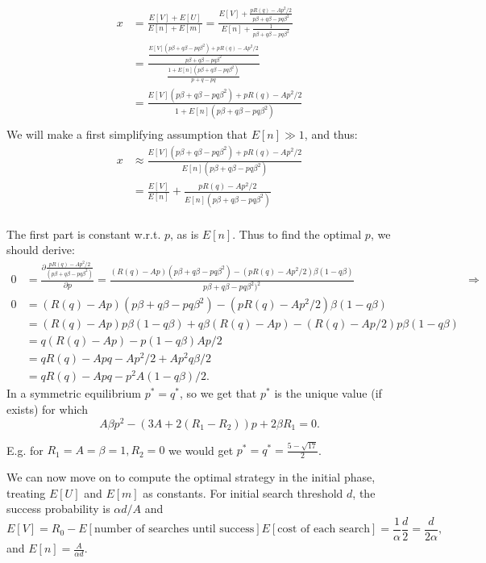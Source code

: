 {%
    \begin{align*}
        x&= \frac{E[V]+E[U]}{E[n]+E[m]} = \frac{E[V]+\frac{p R(q)-Ap^2/2}{p\beta+q\beta-pq\beta^2}}{E[n]+\frac{1}{p\beta+q\beta-pq\beta^2}}\\
        &=\frac{\frac{E[V](p\beta+q\beta-pq\beta^2)+p R(q)-Ap^2/2}{p\beta+q\beta-pq\beta^2}}{\frac{1+E[n](p\beta+q\beta-pq\beta^2)}{p+q-pq}}\\
&=\frac{E[V](p\beta+q\beta-pq\beta^2)+p R(q)-Ap^2/2}{1+E[n](p\beta+q\beta-pq\beta^2)}\\
    \end{align*}
    We will make a first simplifying assumption that $E[n]\gg 1$, and thus:
    \begin{align*}
        x&\approx \frac{E[V](p\beta+q\beta-pq\beta^2)+p R(q)-Ap^2/2}{E[n](p\beta+q\beta-pq\beta^2)}\\
        &=\frac{E[V]}{E[n]} + \frac{p R(q)-Ap^2/2}{E[n](p\beta+q\beta-pq\beta^2)}\\
    \end{align*}
    
The first part is constant w.r.t. $p$, as is $E[n]$. 
    Thus to find the optimal $p$, we should derive:
    \begin{align*}
        0 &= \frac{\partial \frac{p R(q)-Ap^2/2}{(p\beta+q\beta-pq\beta^2)}}{\partial p} = \frac{( R(q)-Ap)(p\beta+q\beta-pq\beta^2)-(p R(q)-Ap^2/2)\beta(1-q\beta)}{p\beta+q\beta-pq\beta^2)^2}&\Rightarrow\\
        0&=( R(q)-Ap)(p\beta+q\beta-pq\beta^2)-(p R(q)-Ap^2/2)\beta(1-q\beta) \\
        &=(R(q)-Ap)p\beta(1-q\beta)+q\beta(R(q)-Ap) - (R(q)-Ap/2)p\beta(1-q\beta)\\
        &=q(R(q)-Ap)-p(1-q\beta)Ap/2\\
        &=qR(q) - Apq -Ap^2/2 +Ap^2q\beta/2\\
        &=qR(q) - Apq - p^2A(1-q\beta)/2.
    \end{align*}
In a symmetric equilibrium $p^*=q^*$, so we get that $p^*$ is the unique value (if exists) for which 
$$A\beta p^2 - (3A+2(R_1-R_2))p + 2\beta R_1=0.$$
    

    
E.g. for $R_1=A=\beta=1, R_2=0$ we would get $p^*=q^*=\frac{5-\sqrt{17}}{2}$.

\medskip
We can now move on to compute the optimal strategy in the initial phase, treating $E[U]$ and $E[m]$ as constants. 
For initial search threshold $d$, the success probability is $\alpha d/A$ and 
$$ E[V]=R_0-E[\text{number of searches until success}]E[\text{cost of each search}]=\frac{1}{\alpha}\frac{d}{2} =\frac{d}{2\alpha}, $$
and $E[n]=\frac{A}{\alpha d}$.

}
